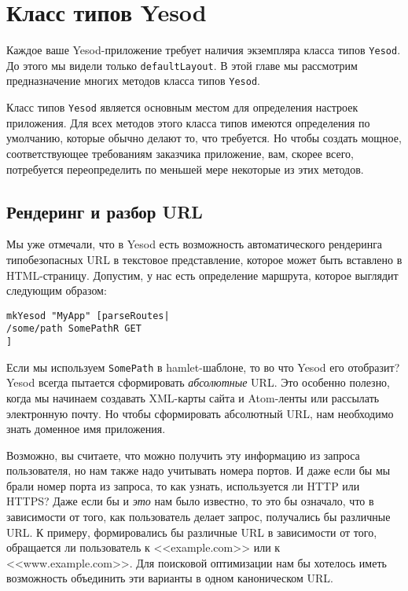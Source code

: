 \chapter {Класс типов Yesod}\label{chap:yesod-typeclass}

Каждое ваше Yesod-приложение требует наличия экземпляра класса типов \lstinline!Yesod!. До этого мы видели только \lstinline!defaultLayout!. В этой главе мы рассмотрим предназначение многих методов класса типов \lstinline!Yesod!.

Класс типов \lstinline!Yesod! является основным местом для определения настроек приложения. Для всех методов этого класса типов имеются определения по умолчанию, которые обычно делают то, что требуется. Но чтобы создать мощное, соответствующее требованиям заказчика приложение, вам, скорее всего, потребуется переопределить по меньшей мере некоторые из этих методов.

\section {Рендеринг и разбор URL}

Мы уже отмечали, что в Yesod есть возможность автоматического рендеринга типобезопасных URL в текстовое представление, которое может быть вставлено в HTML-страницу. Допустим, у нас есть определение маршрута, которое выглядит следующим образом:

\begin{lstlisting}
mkYesod "MyApp" [parseRoutes|
/some/path SomePathR GET
]
\end{lstlisting}

Если мы используем \lstinline!SomePath! в hamlet-шаблоне, то во что Yesod его отобразит? Yesod всегда пытается сформировать \emph{абсолютные} URL. Это особенно полезно, когда мы начинаем создавать XML-карты сайта и Atom-ленты или рассылать электронную почту. Но чтобы сформировать абсолютный URL, нам необходимо знать доменное имя приложения.

Возможно, вы считаете, что можно получить эту информацию из запроса пользователя, но нам также надо учитывать номера портов. И даже если бы мы брали номер порта из запроса, то как узнать, используется ли HTTP или HTTPS? Даже если бы и \emph{это} нам было известно, то это бы означало, что в зависимости от того, как пользователь делает запрос, получались бы различные URL. К примеру, формировались бы различные URL в зависимости от того, обращается ли пользователь к <<example.com>> или к <<www.example.com>>. Для поисковой оптимизации нам бы хотелось иметь возможность объединить эти варианты в одном каноническом URL.

